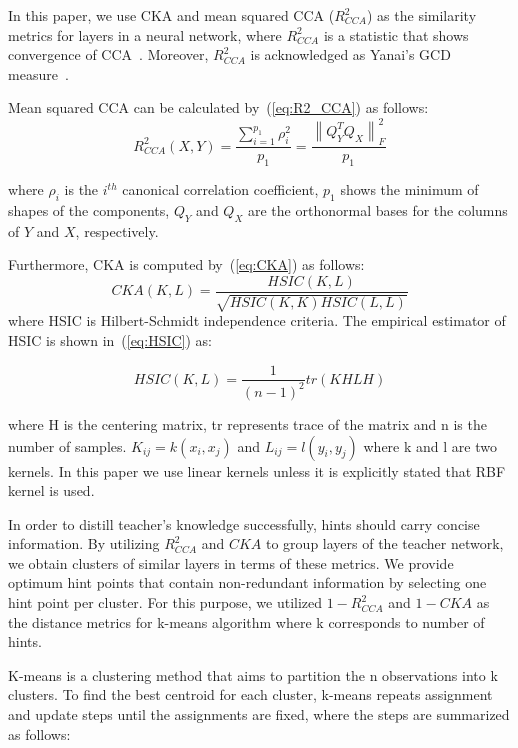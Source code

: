 \documentclass[final,3p,times]{elsarticle}
\begin{document}
In this paper, we use CKA and mean squared CCA ($R^2_{CCA}$) as the similarity metrics for layers in a neural network, where $R^2_{CCA}$ is a statistic that shows convergence of CCA~\citep{kornblith2019similarity}. Moreover, $R^2_{CCA}$ is acknowledged as Yanai’s GCD measure~\citep{ramsay1984matrix}.

Mean squared CCA can be calculated by~(\ref{eq:R2_CCA}) as follows:
\begin{equation}
\label{eq:R2_CCA}
    R^2_{CCA}(X,Y) = \frac{ \sum_{i=1}^{p_1} \rho^2_i}{p_1} = \frac{{\left \| Q_Y^T Q_X \right \|}_F^2}{p_1}
\end{equation}


\noindent where $\rho_i$ is the $i^{th}$ canonical correlation coefficient, $p_1$ shows the minimum of shapes of the components, $Q_Y$ and $Q_X$ are the orthonormal bases for the columns of $Y$ and $X$, respectively.

Furthermore, CKA is computed by~(\ref{eq:CKA}) as follows:
\begin{equation}
\label{eq:CKA}
    CKA(K,L) = \frac{ HSIC(K,L)}{  \sqrt{HSIC(K,K) HSIC(L,L)}}
\end{equation}
where HSIC is Hilbert-Schmidt independence criteria. The empirical estimator of HSIC is shown in~(\ref{eq:HSIC}) as:

\begin{equation}
\label{eq:HSIC}
    HSIC(K,L) = \frac{1}{(n-1)^2}tr(KHLH)
\end{equation}

\noindent where H is the centering matrix, tr represents trace of the matrix and n is the number of samples. $K_{ij} = k(x_i,x_j)$ and $L_{ij} = l(y_i,y_j)$ where k and l are two kernels. In this paper we use linear kernels unless it is explicitly stated that RBF kernel is used. 


In order to distill teacher's knowledge successfully, hints should carry concise information. By utilizing $R^2_{CCA}$ and $CKA$ to group layers of the teacher network, we obtain clusters of similar layers in terms of these metrics. We provide optimum hint points that contain non-redundant information by selecting one hint point per cluster. For this purpose, we utilized  $1 - R^2_{CCA}$ and $1 - CKA$ as the distance metrics for k-means algorithm where k corresponds to number of hints. 

K-means is a clustering method that aims to partition the n observations into k clusters. To find the best centroid for each cluster, k-means repeats assignment and update steps until the assignments are fixed, where the steps are summarized as follows:
\end{document}
